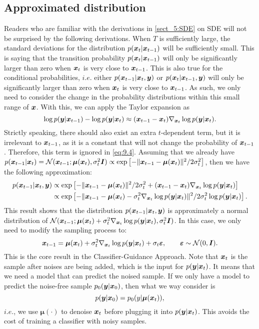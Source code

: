 \subsection{Approximated distribution}
Readers who are familiar with the derivations in \cref{sect_5:SDE} on SDE will not be surprised by the following derivations. When $T$ is sufficiently large, the standard deviations for the distribution $p(\bm{x}_{t}|\bm{x}_{t-1})$ will be sufficiently small. This is saying that the transition probability $p(\bm{x}_{t}|\bm{x}_{t-1})$ will only be significantly larger than zero when $\bm{x}_{t}$ is very close to $\bm{x}_{t-1}$. This is also true for the conditional probabilities, $i.e.$ either $p(\bm{x}_{t-1}|\bm{x}_{t},\bm{y})$ or $p(\bm{x}_{t}|\bm{x}_{t-1},\bm{y})$ will only be significantly larger than zero when $\bm{x}_{t}$ is very close to $\bm{x}_{t-1}$. As such, we  only need to consider the change in the probability distributions within this small range of $\bm{x}$. With this, we can apply the Taylor expansion as 
\begin{equation}
    \label{eq:9.4}
    \log p(\bm{y}|\bm{x}_{t-1})-\log p(\bm{y}|\bm{x}_{t}) \approx (\bm{x}_{t-1}-\bm{x}_{t})\nabla_{\bm{x}_{t}}\log p(\bm{y}|\bm{x}_{t}).
\end{equation}
Strictly speaking, there should also exist an extra $t$-dependent term, but it is irrelevant to $\bm{x}_{t-1}$, as it is a constant that will not change the probability of $\bm{x}_{t-1}$. Therefore, this term is ignored in \cref{eq:9.4}. Assuming that we already have $p(\bm{x}_{t-1}|\bm{x}_{t})=\mathcal{N}(\bm{x}_{t-1};\bm{\mu}(\bm{x}_{t}),\sigma_t^2\bm{I})\propto\exp\left[-\|\bm{x}_{t-1}-\bm{\mu}(\bm{x}_{t})\|^2/2\sigma_t^2\right]$, then we have the following approximation:
\begin{align}
    p(\bm{x}_{t-1}|\bm{x}_{t},\bm{y})&\propto \exp\left[-\|\bm{x}_{t-1}-\bm{\mu}(\bm{x}_{t})\|^2/2\sigma_t^2 +(\bm{x}_{t-1}-\bm{x}_{t})\nabla_{\bm{x}_{t}}\log p(\bm{y}|\bm{x}_{t})\right]\nonumber\\
    &\propto \exp\left[-\|\bm{x}_{t-1}-\bm{\mu}(\bm{x}_{t}) - \sigma_t^2\nabla_{\bm{x}_{t}}\log p(\bm{y}|\bm{x}_{t})\|^2/2\sigma_t^2\log p(\bm{y}|\bm{x}_{t})\right].\label{eq:9.5}
\end{align}
This result shows that the distribution $p(\bm{x}_{t-1}|\bm{x}_{t},\bm{y})$ is approximately a normal distribution of $\mathcal{N}(\bm{x}_{t-1};\bm{\mu}(\bm{x}_{t})+\sigma_t^2\nabla_{\bm{x}_{t}}\log p(\bm{y}|\bm{x}_{t}),
\sigma_t^2\bm{I})$. In this case, we only need to modify the sampling process to:
\begin{equation}
    \label{eq:9.6}
    \bm{x}_{t-1}=\bm{\mu}(\bm{x}_{t})+\sigma_t^2\nabla_{\bm{x}_{t}}\log p(\bm{y}|\bm{x}_{t})+\sigma_t\bm{\varepsilon},\qquad \bm{\varepsilon}\sim\mathcal{N}(0,\bm{I}).
\end{equation}
This is the core result in the Classifier-Guidance Approach. Note that $\bm{x}_{t}$ is the sample after noises are being added, which is the input for $p(\bm{y}|\bm{x}_{t})$. It means that we need a model that can predict the noised sample. If we only have a model to predict the noise-free sample $p_0(\bm{y}|\bm{x}_0)$, then what we way consider is 
\begin{equation}
    \label{eq:9.7}
    p(\bm{y}|\bm{x}_0)=p_{0}(y|\bm{\mu}(\bm{x}_{t})),
\end{equation}
$i.e.$, we use $\bm{\mu}(\cdot)$ to denoise $\bm{x}_{t}$ before plugging it into $p(\bm{y}|\bm{x}_{t})$. This avoids the cost of training a classifier with noisy samples.

